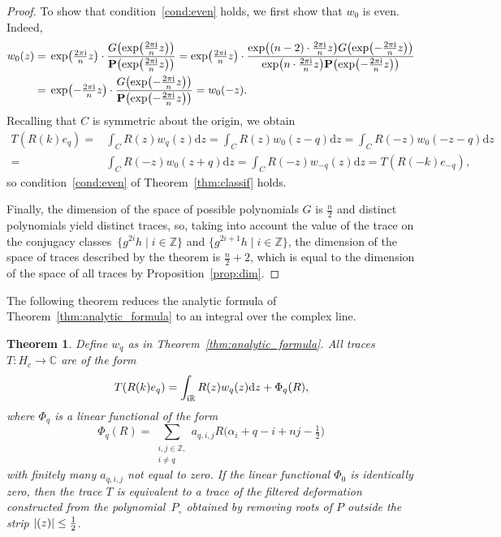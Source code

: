 \documentclass[pdftex]{sigma}
\newcommand\ZZ{\mathbb{Z}}
\newcommand\RR{\mathbb{R}}
\newcommand\CC{\mathbb{C}}
\newcommand\bP{\textbf{P}}
\newcommand\rn{\frac{2\pi {\rm i}}{n}}
\newcommand\trn{\tfrac{2\pi {\rm i}}{n}}
\renewcommand\d{\mathrm{d}}
\let\Re\relax
\DeclareMathOperator\Re{Re}
\newcommand\half{\ensuremath{\frac{1}{2}}}
\newcommand\thalf{\ensuremath{\tfrac12}}
\numberwithin{equation}{section}
\newtheorem{Theorem}{Theorem}[section]
\theoremstyle{definition}
\begin{document}
\begin{proof}
 To show that condition~\ref{cond:even} holds,
 we first show that $w_0$ is even.
 Indeed,
 \begin{align*}
 w_0 (z) ={}& \exp\bigl(\trn z\bigr) \cdot
 \frac{G\bigl( \exp\bigl(\rn z\bigr) \bigr)}
 {\bP\bigl( \exp\bigl(\rn z\bigr) \bigr)} = \exp\bigl(\trn z\bigr) \cdot
 \frac{\exp\bigl((n - 2) \cdot \rn z\bigr)
 G\bigl( \exp\bigl(-\rn z\bigr) \bigr)}
 {\exp\bigl(n \cdot \rn z\bigr)
 \bP\bigl( \exp\bigl(-\rn z\bigr) \bigr)} \\
 ={}& \exp\bigl(-\trn z\bigr) \cdot
 \frac{G\bigl( \exp\bigl(-\rn z\bigr) \bigr)}
 {\bP\bigl( \exp\bigl(-\rn z\bigr) \bigr)} = w_0 (-z).
 \end{align*}
 Recalling that $C$ is symmetric about the origin, we obtain
 \begin{align*}
 T( R(k) e_q )
 ={}& \int_{C} R(z) w_q(z) \d z = \int_{C} R(z) w_0 (z - q) \d z = \int_{C} R(-z) w_0 (-z - q) \d z \\
 ={}& \int_{C} R(-z) w_0 (z + q) \d z = \int_{C} R(-z) w_{-q}(z) \d z = T( R(-k) e_{-q} ),
 \end{align*}
 so condition~\ref{cond:even} of Theorem~\ref{thm:classif} holds.

 Finally, the dimension of the space of possible polynomials $G$
 is $\frac{n}{2}$ and distinct polynomials yield distinct traces,
 so, taking into account the value of the trace
 on the conjugacy classes~$\big\{g^{2i} h \mid i \in \ZZ\big\}$ and $\big\{g^{2i + 1} h \mid i \in \ZZ\big\}$,
 the dimension of the space of traces described by the theorem
 is $\frac{n}{2} + 2$, which is equal to the dimension
 of the space of all traces by Proposition~\ref{prop:dim}.
\end{proof}

The following theorem reduces the analytic formula
of Theorem~\ref{thm:analytic_formula}
to an integral over the complex line.

\begin{Theorem}
 \label{thm:analytic_formula_R}
 Define $w_q$ as in Theorem~{\rm\ref{thm:analytic_formula}}.
 All traces $T \colon H_c \rightarrow \CC$ are of the form
 \[
 T(R(k) e_q) = \int_{{\rm i}\RR} R(z) w_q(z) \d z
 + \Phi_q(R),
 \]
 where $\Phi_q$ is a linear functional of the form
 \[
 \Phi_q(R) = \sum_{\substack{i, j \in \ZZ, \\ i \neq q}}
 a_{q, i, j} R\bigl(\alpha_i + q - i + nj - \thalf\bigr)
 \]
 with finitely many $a_{q, i, j}$ not equal to zero.
 If the linear functional $\Phi_0$ is identically zero,
 then the trace $T$ is equivalent to a trace
 of the filtered deformation
 constructed from the polynomial~$P_{\circ}$
 obtained by removing roots of $P$ outside the strip
 $|{\Re(z)}| \leq \half$.
\end{Theorem}
\end{document}
